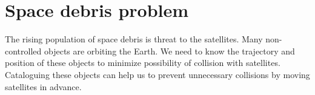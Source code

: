 \section{Space debris problem}

The rising population of space debris is threat to the satellites. Many non-controlled objects are orbiting the Earth. We need to know the trajectory and position of these objects to minimize possibility of collision with satellites. Cataloguing these objects can help us to prevent unnecessary collisions by moving satellites in advance. \cite{silha2019development}